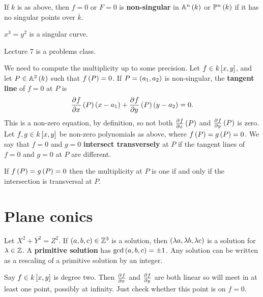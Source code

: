 \begin{definition}
If $ k $ is as above, then $ f = 0 $ or $ F = 0 $ is \textbf{non-singular} in $ \AA^n\br{k} $ or $ \PP^n\br{k} $ if it has no singular points over $ \overline{k} $.
\end{definition}

\begin{example*}
$ x^3 = y^2 $ is a singular curve.
\end{example*}


Lecture 7 is a problems class.


We need to compute the multiplicity up to some precision. Let $ f \in k\sbr{x, y} $, and let $ P \in \AA^2\br{k} $ such that $ f\br{P} = 0 $. If $ P = \br{a_1, a_2} $ is non-singular, the \textbf{tangent line} of $ f = 0 $ at $ P $ is
$$ \dpd{f}{x}\br{P}\br{x - a_1} + \dpd{f}{y}\br{P}\br{y - a_2} = 0. $$
This is a non-zero equation, by definition, so not both $ \tpd{f}{x}\br{P} $ and $ \tpd{f}{y}\br{P} $ is zero. Let $ f, g \in k\sbr{x, y} $ be non-zero polynomials as above, where $ f\br{P} = g\br{P} = 0 $. We say that $ f = 0 $ and $ g = 0 $ \textbf{intersect transversely} at $ P $ if the tangent lines of $ f = 0 $ and $ g = 0 $ at $ P $ are different.

\begin{theorem}
If $ f\br{P} = g\br{P} = 0 $ then the multiplicity at $ P $ is one if and only if the intersection is transversal at $ P $.
\end{theorem}

\pagebreak

\section{Plane conics}

Let $ X^2 + Y^2 = Z^2 $. If $ \br{a, b, c} \in \ZZ^3 $ is a solution, then $ \br{\lambda a, \lambda b, \lambda c} $ is a solution for $ \lambda \in \mathbb{Z} $. A \textbf{primitive solution} has $ \gcd\br{a, b, c} = \pm 1 $. Any solution can be written as a rescaling of a primitive solution by an integer.

\begin{algorithm}
Say $ f \in k\sbr{x, y} $ is degree two. Then $ \tpd{f}{x} $ and $ \tpd{f}{y} $ are both linear so will meet in at least one point, possibly at infinity. Just check whether this point is on $ f = 0 $.
\end{algorithm}

